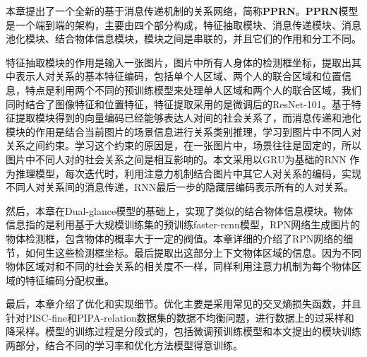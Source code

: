本章提出了一个全新的基于消息传递机制的关系网络，简称\textbf{PPRN}。\textbf{PPRN}模型是一个端到端的架构，主要由四个部分构成，特征抽取模块、消息传递模块、消息池化模块、结合物体信息模块，模块之间是串联的，并且它们的作用和分工不同。

特征抽取模块的作用是输入一张图片，图片中所有人身体的检测框坐标，提取出其中表示人对关系的基本特征编码，包括单个人区域、两个人的联合区域和位置信息，特点是利用两个不同的预训练模型来处理单人区域和两个人的联合区域，我们同时结合了图像特征和位置特征，特征提取采用的是微调后的ResNet-101。基于特征提取模块得到的向量编码已经能够表达人对间的社会关系了，而消息传递和池化模块的作用是结合当前图片的场景信息进行关系类别推理，学习到图片中不同人对关系之间约束。学习这个约束的原因是，在一张图片中，场景往往是固定的，所以图片中不同人对的社会关系之间是相互影响的。本文采用以GRU为基础的RNN 作为推理模型，每次迭代时，利用注意力机制结合图片中其它人对关系的编码，实现不同人对关系间的消息传递，RNN最后一步的隐藏层编码表示所有的人对关系。

然后，本章在Dual-glance模型的基础上，实现了类似的结合物体信息模块。物体信息指的是利用基于大规模训练集的预训练faster-rcnn模型，RPN网络生成图片的物体检测框，包含物体的概率大于一定的阀值。本章详细的介绍了RPN网络的细节，如何生这些检测框坐标。最后提取出这部分上下文物体区域的信息。因为不同物体区域对和不同的社会关系的相关度不一样，同样利用注意力机制为每个物体区域的特征编码分配权重。

最后，本章介绍了优化和实现细节。优化主要是采用常见的交叉熵损失函数，并且针对PISC-fine和PIPA-relation数据集的数据不均衡问题，进行数据上的过采样和降采样。模型的训练过程是分段式的，包括微调预训练模型和本文提出的模块训练两部分，结合不同的学习率和优化方法模型得意训练。




